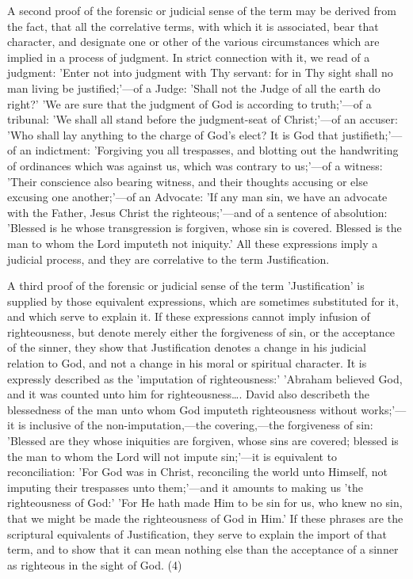 \documentclass[
]{book}
\begin{document}
A second proof of the forensic or judicial sense of the term may be derived from the fact, that all the correlative terms, with which it is associated, bear that character, and designate one or other of the various circumstances which are implied in a process of judgment. In strict connection with it, we read of a judgment: 'Enter not into judgment with Thy servant: for in Thy sight shall no man living be justified;'---of a Judge: 'Shall not the Judge of all the earth do right?' 'We are sure that the judgment of God is according to truth;'---of a tribunal: 'We shall all stand before the judgment-seat of Christ;'---of an accuser: 'Who shall lay anything to the charge of God's elect? It is God that justifieth;'---of an indictment: 'Forgiving you all trespasses, and blotting out the handwriting of ordinances which was against us, which was contrary to us;'---of a witness: 'Their conscience also bearing witness, and their thoughts accusing or else excusing one another;'---of an Advocate: 'If any man sin, we have an advocate with the Father, Jesus Christ the righteous;'---and of a sentence of absolution: 'Blessed is he whose transgression is forgiven, whose sin is covered. Blessed is the man to whom the Lord imputeth not iniquity.' All these expressions imply a judicial process, and they are correlative to the term Justification.

A third proof of the forensic or judicial sense of the term 'Justification' is supplied by those equivalent expressions, which are sometimes substituted for it, and which serve to explain it. If these expressions cannot imply infusion of righteousness, but denote merely either the forgiveness of sin, or the acceptance of the sinner, they show that Justification denotes a change in his judicial relation to God, and not a change in his moral or spiritual character. It is expressly described as the 'imputation of righteousness:' 'Abraham believed God, and it was counted unto him for righteousness\ldots. David also describeth the blessedness of the man unto whom God imputeth righteousness without works;'---it is inclusive of the non-imputation,---the covering,---the forgiveness of sin: 'Blessed are they whose iniquities are forgiven, whose sins are covered; blessed is the man to whom the Lord will not impute sin;'---it is equivalent to reconciliation: 'For God was in Christ, reconciling the world unto Himself, not imputing their trespasses unto them;'---and it amounts to making us 'the righteousness of God:' 'For He hath made Him to be sin for us, who knew no sin, that we might be made the righteousness of God in Him.' If these phrases are the scriptural equivalents of Justification, they serve to explain the import of that term, and to show that it can mean nothing else than the acceptance of a sinner as righteous in the sight of God. (4)
\end{document}
